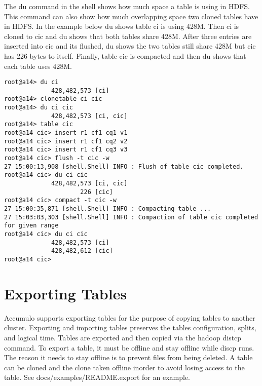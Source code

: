 The du command in the shell shows how much space a table is using in HDFS.
This command can also show how much overlapping space two cloned tables have in
HDFS. In the example below du shows table ci is using 428M. Then ci is cloned
to cic and du shows that both tables share 428M. After three entries are
inserted into cic and its flushed, du shows the two tables still share 428M but
cic has 226 bytes to itself. Finally, table cic is compacted and then du shows
that each table uses 428M.

\begingroup\fontsize{8pt}{8pt}\selectfont\begin{verbatim}
root@a14> du ci           
             428,482,573 [ci]
root@a14> clonetable ci cic
root@a14> du ci cic
             428,482,573 [ci, cic]
root@a14> table cic
root@a14 cic> insert r1 cf1 cq1 v1
root@a14 cic> insert r1 cf1 cq2 v2
root@a14 cic> insert r1 cf1 cq3 v3 
root@a14 cic> flush -t cic -w 
27 15:00:13,908 [shell.Shell] INFO : Flush of table cic completed.
root@a14 cic> du ci cic       
             428,482,573 [ci, cic]
                     226 [cic]
root@a14 cic> compact -t cic -w
27 15:00:35,871 [shell.Shell] INFO : Compacting table ...
27 15:03:03,303 [shell.Shell] INFO : Compaction of table cic completed for given range
root@a14 cic> du ci cic        
             428,482,573 [ci]
             428,482,612 [cic]
root@a14 cic> 
\end{verbatim}\endgroup

\section{Exporting Tables}

Accumulo supports exporting tables for the purpose of copying tables to another
cluster. Exporting and importing tables preserves the tables configuration,
splits, and logical time. Tables are exported and then copied via the hadoop
distcp command. To export a table, it must be offline and stay offline while
discp runs. The reason it needs to stay offline is to prevent files from being
deleted. A table can be cloned and the clone taken offline inorder to avoid
losing access to the table. See docs/examples/README.export for an example.
